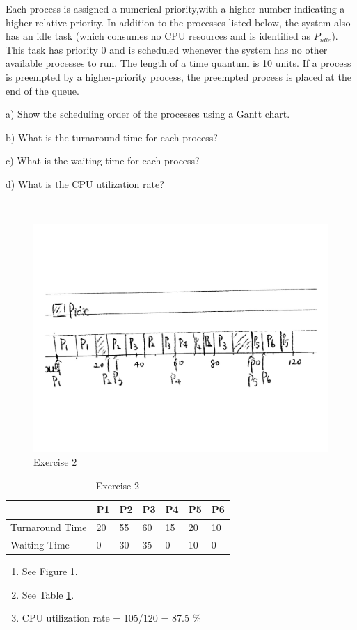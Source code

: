 \begin{exercise}[]
{    Each process is assigned a numerical priority,with a higher number indicating a higher relative priority. In addition to the processes listed below, the system also has an idle task (which consumes no CPU resources and is identified as $P_{idle}$). This task has priority 0 and is scheduled whenever the system has no other available processes to run. The length of a time quantum is 10 units. If a process is preempted by a higher-priority process, the preempted process is placed at the end of the queue.
    \item [a)]
    Show the scheduling order of the processes using a Gantt chart.
    \item [b)]
    What is the turnaround time for each process?
    \item [c)]
    What is the waiting time for each process?
    \item [d)]
    What is the CPU utilization rate?
    }
  \begin{solution}
  \par{~}
  \begin{figure}
      \centering
      \includegraphics[width=12cm]{ex9-2.jpg}
      \caption{Exercise 2}
      \label{fig2}
  \end{figure}

  \begin{table}
      \centering
      \begin{tabular}{lllllll}
          \hline
          & P1 & P2 & P3 & P4 & P5 & P6 \\ \hline
          Turnaround Time & 20 & 55 & 60 & 15 & 20 & 10 \\
          Waiting Time    & 0  & 30 & 35 & 0  & 10 & 0  \\ \hline
      \end{tabular}
      \caption{Exercise 2\label{tab2}}
  \end{table}
  \begin{enumerate}
    \item See Figure \ref{fig2}.
    \item See Table \ref{tab2}.
    \item{
        CPU utilization rate = 105/120 = 87.5 \%
    }
    \end{enumerate}
  \end{solution}
  \label{ex2}
\end{exercise}




